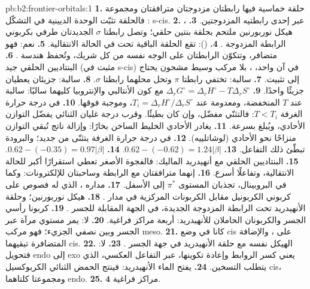 \begin{solution}{pb:b2:frontier-orbitals:1}
\textbf{1.} حلقة خماسية فيها رابطتان مزدوجتان مترافقتان ومجموعة : فالحلقة
تثبّت الوحدة الديينية في التشكّل s-cis.
\textbf{2.} ، عبر إحدى رابطتيه المزدوجتين.
\textbf{3.} هيكل نوربورنين ملتحم بحلقة بنتين حلقي؛ وتصل رابطتا $\sigma$ الجديدتان
طرفي  بكربوني الرابطة المزدوجة .
\textbf{4.}  (): تقع الحلقة الباقية  تحت
 في الحالة الانتقالية.
\textbf{5.} نعم: فهو متضافر، وتتكوّن الرابطتان على الوجه نفسه من كل شريك، 
وتُحفظ هندسة .
\textbf{6.} البنتاديين الحلقي  جيد (مثبت في s-cis)  في آن واحد، 
، بلا مركب وسيط مشحون يحتاج إلى تثبيت.
\textbf{7.} سالبة: تختفي رابطتا $\pi$ وتحل محلهما رابطتا $\sigma$.
\textbf{8.} سالبة: جزيئان يعطيان جزيئًا واحدًا.
\textbf{9.} $\Delta_r G^\circ = \Delta_r H^\circ - T\Delta_r S^\circ$ مع كون الأنتالبي والإنتروبيا كليهما سالبًا: سالبة عند
$T$ المنخفضة، ومعدومة عند $T_i = \Delta_r H^\circ/\Delta_r S^\circ$، وموجبة فوقها.
\textbf{10.} في درجة حرارة الغرفة $T < T_i$: فالتثنّي مفضّل، وإن كان بطيئًا. وقرب
درجة غليان الثنائي يفضّل التوازن الأحادي، ويُبلغ
بسرعة.
\textbf{11.} يغادر الأحادي الخليط الساخن بخارًا: وإزالة ناتج تُبقي
التوازن منزاحًا نحو الأحادي (لوشاتلييه).
\textbf{12.} في درجة حرارة الغرفة يتثنّى من جديد؛ والبرودة تبطّئ ذلك التفاعل.
\textbf{13.} $0.62 - (-0.62) = 1.24|\beta|$.
\textbf{14.} $0.62 - (-0.35) = 0.97|\beta|$.
\textbf{15.} البنتاديين الحلقي مع أنهيدريد الماليك: فالفجوة الأصغر تعطي استقرارًا أكبر
للحالة الانتقالية، وتفاعلًا أسرع.
\textbf{16.} إنهما مترافقتان مع الرابطة  وساحبتان للإلكترونات: وكما في
البروبينال، تجذبان المستوى $\pi^*$ إلى الأسفل.
\textbf{17.} مداره ، الذي له فصوص على كربوني الكربونيل مقابل الكربونات المركزية في
مدار  .
\textbf{18.} هيكل نوربورنين؛ وحلقة الأنهيدريد تحت الرابطة المزدوجة الجديدة، في الجهة المقابلة
للجسر .
\textbf{19.} كربونا رأسي الجسر والكربونان الحاملان للأنهيدريد: أربعة
مراكز فراغية.
\textbf{20.} لا: يمر مستوي مرآة عبر الجسر  وبين نصفي
الجزيء؛ فهو مركب meso.
\textbf{21.} كانا في وضع cis على ، والإضافة المتضافرة تبقيهما cis.
\textbf{22.} الهيكل نفسه مع حلقة الأنهيدريد في جهة الجسر .
\textbf{23.} لا: فتحويل endo إلى exo يعني كسر الروابط  وإعادة تكوينها، عبر
التفاعل العكسي، الذي يتطلب التسخين.
\textbf{24.} يفتح الماء الأنهيدريد: فينتج الحمض الثنائي الكربوكسيل cis، ومجموعتا  كلتاهما endo.
\textbf{25.}  $\boldsymbol{4}$ مراكز فراغية.
\end{solution}
